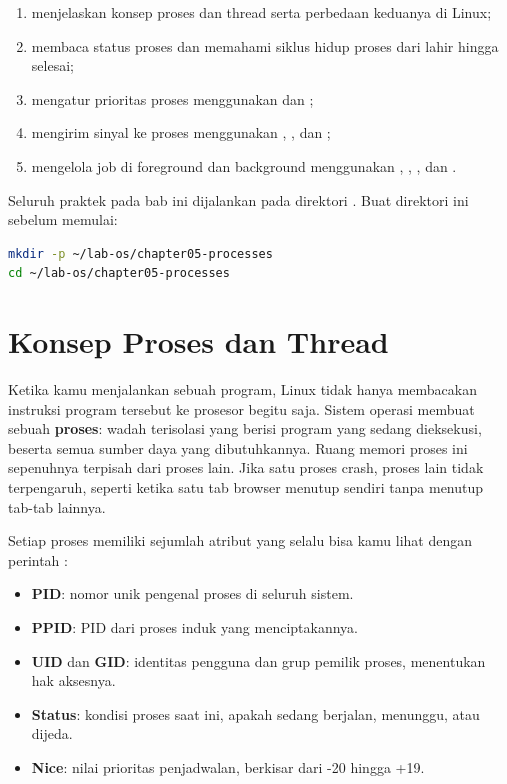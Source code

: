 \begin{enumerate}
    \item menjelaskan konsep proses dan thread serta perbedaan keduanya di Linux;
    \item membaca status proses dan memahami siklus hidup proses dari lahir hingga selesai;
    \item mengatur prioritas proses menggunakan  dan ;
    \item mengirim sinyal ke proses menggunakan , , dan ;
    \item mengelola job di foreground dan background menggunakan , , , dan .
\end{enumerate}

\begin{notebox}
Seluruh praktek pada bab ini dijalankan pada direktori .
Buat direktori ini sebelum memulai:
\begin{lstlisting}[language=bash]
mkdir -p ~/lab-os/chapter05-processes
cd ~/lab-os/chapter05-processes
\end{lstlisting}
\end{notebox}

\section{Konsep Proses dan Thread}
\label{sec:process-concept}

Ketika kamu menjalankan sebuah program, Linux tidak hanya membacakan instruksi program
tersebut ke prosesor begitu saja. Sistem operasi membuat sebuah \textbf{proses}: wadah
terisolasi yang berisi program yang sedang dieksekusi, beserta semua sumber daya yang
dibutuhkannya. Ruang memori proses ini sepenuhnya terpisah dari proses lain. Jika satu
proses crash, proses lain tidak terpengaruh, seperti ketika satu tab browser menutup
sendiri tanpa menutup tab-tab lainnya.

Setiap proses memiliki sejumlah atribut yang selalu bisa kamu lihat dengan perintah
:

\begin{itemize}
    \item \textbf{PID}: nomor unik pengenal proses di seluruh sistem.
    \item \textbf{PPID}: PID dari proses induk yang menciptakannya.
    \item \textbf{UID} dan \textbf{GID}: identitas pengguna dan grup pemilik proses, menentukan hak aksesnya.
    \item \textbf{Status}: kondisi proses saat ini, apakah sedang berjalan, menunggu, atau dijeda.
    \item \textbf{Nice}: nilai prioritas penjadwalan, berkisar dari -20 hingga +19.
\end{itemize}

